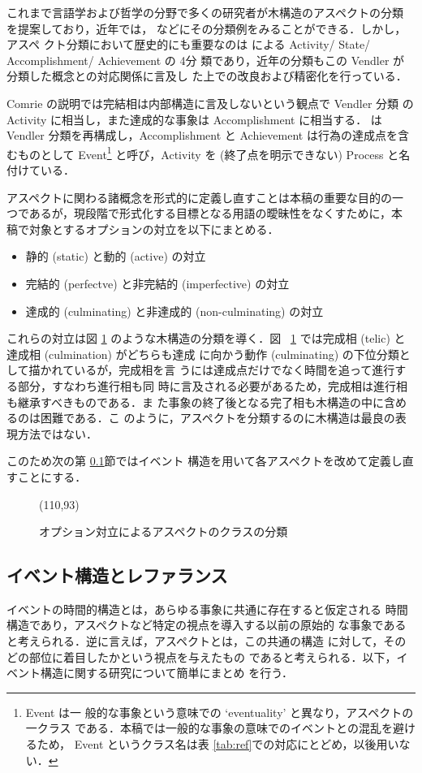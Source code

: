 これまで言語学および哲学の分野で多くの研究者が木構造のアスペクトの分類
を提案しており，近年では，\cite{Allen84,Blackburn96,Parsons90,Binnick91} などにその分類例をみることができる．しかし，アスペ
クト分類において歴史的にも重要なのは \cite{Vendler67} による 
Activity/ State/ Accomplishment/ Achievement の 4分
類であり，近年の分類もこの Vendler が分類した概念との対応関係に言及し
た上での改良および精密化を行っている．

Comrie の説明では完結相は内部構造に言及しないという観点で Vendler 分類
の Activity に相当し，また達成的な事象は Accomplishment に相当する．
\cite{Parsons90} は Vendler 分類を再構成し，Accomplishment と 
Achievement は行為の達成点を含むものとして Event\footnote {Event は一
般的な事象という意味での `eventuality' と異なり，アスペクトの一クラス
である．本稿では一般的な事象の意味でのイベントとの混乱を避けるため，
Event というクラス名は表 \ref{tab:ref}での対応にとどめ，以後用いない．}
と呼び，Activity を (終了点を明示できない) Process と名付けている．

アスペクトに関わる諸概念を形式的に定義し直すことは本稿の重要な目的の一
つであるが，現段階で形式化する目標となる用語の曖昧性をなくすために，本
稿で対象とするオプションの対立を以下にまとめる．
\begin{itemize}
\item 静的 (static) と動的 (active) の対立
\item 完結的 (perfectve) と非完結的 (imperfective) の対立
\item 達成的 (culminating) と非達成的 (non-culminating) 
の対立
\end{itemize}
これらの対立は図 \ref{fig:tree} のような木構造の分類を導く．図~
 \ref{fig:tree} では完成相 (telic) と達成相 (culmination) がどちらも達成
に向かう動作 (culminating) の下位分類として描かれているが，完成相を言
うには達成点だけでなく時間を追って進行する部分，すなわち進行相も同
時に言及される必要があるため，完成相は進行相も継承すべきものである．ま
た事象の終了後となる完了相も木構造の中に含めるのは困難である．こ
のように，アスペクトを分類するのに木構造は最良の表現方法ではない．

このため次の第 \ref{subsec:ont}節ではイベント
構造を用いて各アスペクトを改めて定義し直すことにする．

\begin{figure}[htbp]
\atari(110,93)
\caption{オプション対立によるアスペクトのクラスの分類}\label{fig:tree}
\end{figure}

\subsection{イベント構造とレファランス}\label{subsec:ont}
イベントの時間的構造とは，あらゆる事象に共通に存在すると仮定される 
時間構造であり，アスペクトなど特定の視点を導入する以前の原始的
な事象であると考えられる．逆に言えば，アスペクトとは，この共通の構造
に対して，そのどの部位に着目したかという視点を与えたもの
であると考えられる．以下，イベント構造に関する研究について簡単にまとめ
を行う．

